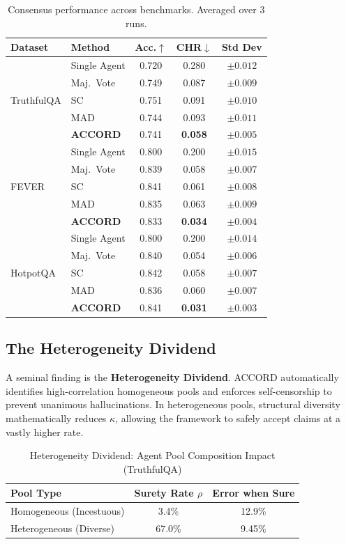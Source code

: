 \documentclass[conference]{IEEEtran}
\begin{document}
\begin{table}[htbp]
\caption{Consensus performance across benchmarks. Averaged over 3 runs.}
\label{tab:main}
\centering
\begin{tabular}{llccc}
\toprule
Dataset & Method & Acc.$\uparrow$ & CHR$\downarrow$ & Std Dev \\
\midrule
\multirow{5}{*}{TruthfulQA}
 & Single Agent  & 0.720 & 0.280 & $\pm 0.012$ \\
 & Maj.\ Vote    & 0.749 & 0.087 & $\pm 0.009$ \\
 & SC            & 0.751 & 0.091 & $\pm 0.010$ \\
 & MAD           & 0.744 & 0.093 & $\pm 0.011$ \\
 & \textbf{ACCORD} & 0.741 & \textbf{0.058} & $\pm 0.005$ \\
\midrule
\multirow{5}{*}{FEVER}
 & Single Agent  & 0.800 & 0.200 & $\pm 0.015$ \\
 & Maj.\ Vote    & 0.839 & 0.058 & $\pm 0.007$ \\
 & SC            & 0.841 & 0.061 & $\pm 0.008$ \\
 & MAD           & 0.835 & 0.063 & $\pm 0.009$ \\
 & \textbf{ACCORD} & 0.833 & \textbf{0.034} & $\pm 0.004$ \\
\midrule
\multirow{5}{*}{HotpotQA}
 & Single Agent  & 0.800 & 0.200 & $\pm 0.014$ \\
 & Maj.\ Vote    & 0.840 & 0.054 & $\pm 0.006$ \\
 & SC            & 0.842 & 0.058 & $\pm 0.007$ \\
 & MAD           & 0.836 & 0.060 & $\pm 0.007$ \\
 & \textbf{ACCORD} & 0.841 & \textbf{0.031} & $\pm 0.003$ \\
\bottomrule
\end{tabular}
\end{table}

\subsection{The Heterogeneity Dividend}
A seminal finding is the \textbf{Heterogeneity Dividend}. ACCORD automatically identifies high-correlation homogeneous pools and enforces self-censorship to prevent unanimous hallucinations. In heterogeneous pools, structural diversity mathematically reduces $\kappa$, allowing the framework to safely accept claims at a vastly higher rate.

\begin{table}[htbp]
\caption{Heterogeneity Dividend: Agent Pool Composition Impact (TruthfulQA)}
\label{tab:diversity}
\centering
\begin{tabular}{lcc}
\toprule
Pool Type & Surety Rate $\rho$ & Error when Sure \\
\midrule
Homogeneous (Incestuous) & 3.4\%  & 12.9\% \\
Heterogeneous (Diverse) & 67.0\% & 9.45\% \\
\bottomrule
\end{tabular}
\end{table}
\end{document}
